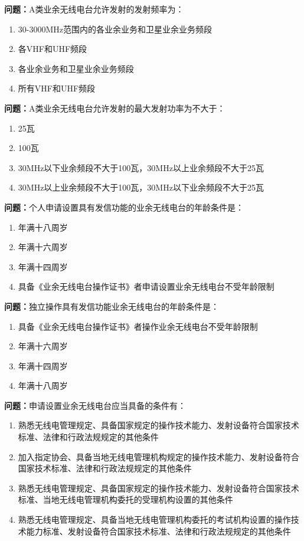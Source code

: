\documentclass[UTF8]{ctexbook}
\begin{document}
\textbf{问题：}A类业余无线电台允许发射的发射频率为：
\begin{enumerate}[label=\Alph*), leftmargin=3em]
  \item 30-3000MHz范围内的各业余业务和卫星业余业务频段
  \item 各VHF和UHF频段
  \item 各业余业务和卫星业余业务频段
  \item 所有VHF和UHF频段
\end{enumerate}

\textbf{问题：}A类业余无线电台允许发射的最大发射功率为不大于：
\begin{enumerate}[label=\Alph*), leftmargin=3em]
  \item 25瓦
  \item 100瓦
  \item 30MHz以下业余频段不大于100瓦，30MHz以上业余频段不大于25瓦
  \item 30MHz以上业余频段不大于100瓦，30MHz以下业余频段不大于25瓦
\end{enumerate}

\textbf{问题：}个人申请设置具有发信功能的业余无线电台的年龄条件是：
\begin{enumerate}[label=\Alph*), leftmargin=3em]
  \item 年满十八周岁
  \item 年满十六周岁
  \item 年满十四周岁
  \item 具备《业余无线电台操作证书》者申请设置业余无线电台不受年龄限制
\end{enumerate}

\textbf{问题：}独立操作具有发信功能业余无线电台的年龄条件是：
\begin{enumerate}[label=\Alph*), leftmargin=3em]
  \item 具备《业余无线电台操作证书》者操作业余无线电台不受年龄限制
  \item 年满十六周岁
  \item 年满十四周岁
  \item 年满十八周岁
\end{enumerate}

\textbf{问题：}申请设置业余无线电台应当具备的条件有：
\begin{enumerate}[label=\Alph*), leftmargin=3em]
  \item 熟悉无线电管理规定、具备国家规定的操作技术能力、发射设备符合国家技术标准、法律和行政法规规定的其他条件
  \item 加入指定协会、具备当地无线电管理机构规定的操作技术能力、发射设备符合国家技术标准、法律和行政法规规定的其他条件
  \item 熟悉无线电管理规定、具备国家规定的操作技术能力、发射设备符合国家技术标准、当地无线电管理机构委托的受理机构设置的其他条件
  \item 熟悉无线电管理规定、具备当地无线电管理机构委托的考试机构设置的操作技术能力标准、发射设备符合国家技术标准、法律和行政法规规定的其他条件
\end{enumerate}
\end{document}
